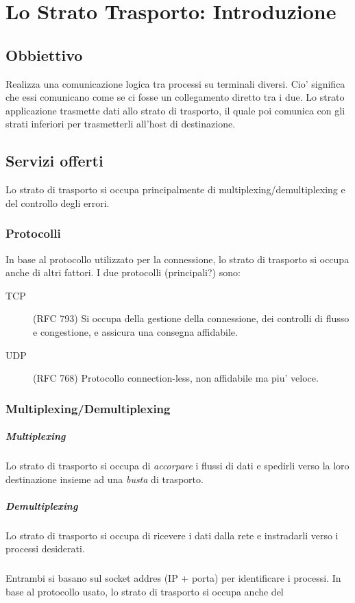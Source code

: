 \chapter{Lo Strato Trasporto: Introduzione}
\section{Obbiettivo}
Realizza una comunicazione logica tra processi su terminali diversi.
Cio' significa che essi comunicano come se ci fosse un collegamento diretto tra i due.
Lo strato applicazione trasmette dati allo strato di trasporto, il quale poi comunica con gli strati inferiori per trasmetterli all'host di destinazione.
\section{Servizi offerti}
Lo strato di trasporto si occupa principalmente di multiplexing/demultiplexing e del controllo degli errori.
\subsection{Protocolli}
In base al protocollo utilizzato per la connessione, lo strato di trasporto si occupa anche di altri fattori.
I due protocolli {\tiny(principali?)} sono:
\begin{description}
    \item[TCP] (RFC 793) Si occupa della gestione della connessione, dei controlli di flusso e congestione, e assicura una consegna affidabile.
    \item[UDP] (RFC 768) Protocollo connection-less, non affidabile ma piu' veloce. 
\end{description}
\subsection{Multiplexing/Demultiplexing}
\paragraph{Multiplexing} Lo strato di trasporto si occupa di \textit{accorpare} i flussi di dati e spedirli verso la loro destinazione insieme ad una \textit{busta} di trasporto.
\paragraph{Demultiplexing} Lo strato di trasporto si occupa di ricevere i dati dalla rete e instradarli verso i processi desiderati.
\paragraph{} Entrambi si basano sul socket addres (IP + porta) per identificare i processi.
In base al protocollo usato, lo strato di trasporto si occupa anche del 
